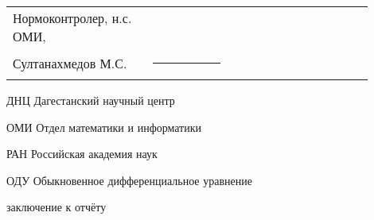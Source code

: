 \documentclass[utf8,usehyperref,12pt]{G7-32}
\begin{document}

\frontmatter %

\NirTitle{%





} %


\Executors %
\begin{longtable}{p{0.35\linewidth}p{0.2\linewidth}p{0.35\linewidth}}


Нормоконтролер, н.с. ОМИ,  &		&	\\
Султанахмедов М.С. & \rule{1\linewidth}{0.1pt}& \\
\end{longtable}



\setcounter{tocdepth}{2} %

\tableofcontents



\Abbreviations %
\begin{abbreviation}
\item[ДНЦ] Дагестанский научный центр
\item[ОМИ] Отдел математики и информатики
\item[РАН] Российская академия наук
\item[ОДУ] Обыкновенное дифференциальное уравнение
\end{abbreviation}




\mainmatter %







\backmatter %

 заключение к отчёту



\end{document}
